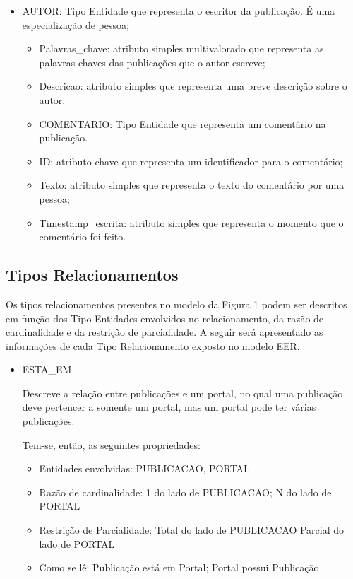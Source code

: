 \documentclass{article}
\begin{document}
\begin{itemize}
\item AUTOR: Tipo Entidade que representa o escritor da publicação. É uma especialização de pessoa;
				\begin{itemize}
\item Palavras\_chave: atributo simples multivalorado que representa as palavras chaves das publicações que o autor escreve;
\item Descricao: atributo simples que representa uma breve descrição sobre o autor.
\item COMENTARIO: Tipo Entidade que representa um comentário na publicação.
\item ID: atributo chave que representa um identificador para o comentário;
\item Texto: atributo simples que representa o texto do comentário por uma pessoa;
\item Timestamp\_escrita: atributo simples que representa o momento que o comentário foi feito.
				\end{itemize}
				\end{itemize}
\subsection{Tipos Relacionamentos}

Os tipos relacionamentos presentes no modelo da Figura 1 podem ser descritos em função dos Tipo Entidades envolvidos no relacionamento, da razão de cardinalidade e da restrição de parcialidade. A seguir será apresentado as informações de cada Tipo Relacionamento exposto no modelo EER.

\begin{itemize}
				
\item ESTA\_EM

Descreve a relação entre publicações e um portal, no qual uma publicação deve pertencer a somente um portal, mas um portal pode ter várias publicações.

Tem-se, então, as seguintes propriedades:

\begin{itemize}

\item Entidades envolvidas: PUBLICACAO, PORTAL
\item Razão de cardinalidade: 1 do lado de PUBLICACAO; N do lado de PORTAL
\item Restrição de Parcialidade: Total do lado de PUBLICACAO                        Parcial do lado de PORTAL
\item Como se lê: Publicação está em Portal; Portal possui Publicação
\end{itemize}
\end{itemize}
\end{document}
